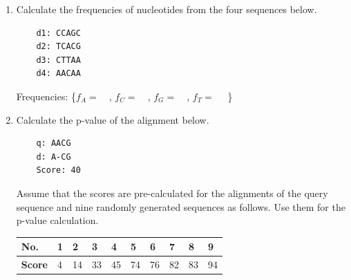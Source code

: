 \begin{enumerate}
\item Calculate the frequencies of nucleotides from the four sequences below.

\begin{verbatim}
    d1: CCAGC
    d2: TCACG
    d3: CTTAA
    d4: AACAA
\end{verbatim}

Frequencies: \{$f_{A} = \quad$, $f_{C} = \quad$, $f_{G} =  \quad$, $f_{T} =  \quad$ \}

\item Calculate the p-value of the alignment below. 

\begin{verbatim}
    q: AACG
    d: A-CG
    Score: 40
\end{verbatim}

\noindent
Assume that the scores are pre-calculated for the alignments of the query sequence and nine randomly generated sequences as follows. Use them for the p-value calculation.

\begin{table}[H]
\centering
\small
\begin{tabular}{|l|l|l|l|l|l|l|l|l|l|}
\hline
\textbf{No.}   & 1 & 2  & 3  & 4  & 5  & 6  & 7  & 8  & 9  \\ \hline
\textbf{Score} & 4 & 14 & 33 & 45 & 74 & 76 & 82 & 83 & 94 \\ \hline
\end{tabular}
\end{table}


\end{enumerate}

\bigskip 

%
